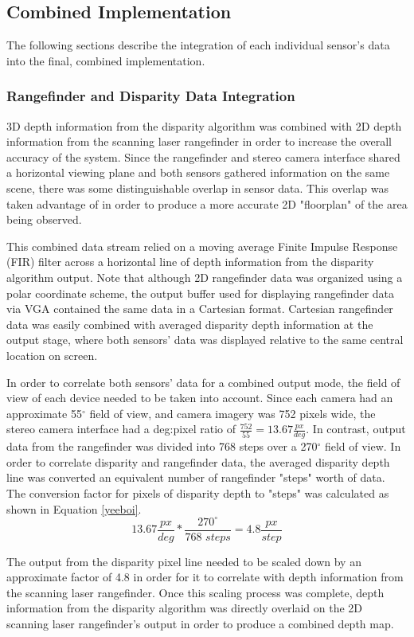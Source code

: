\subsection{Combined Implementation}
The following sections describe the integration of each individual sensor's data into the final, combined implementation. 

\subsubsection{Rangefinder and Disparity Data Integration}
3D depth information from the disparity algorithm was combined with 2D depth information from the scanning laser rangefinder in order to increase the overall accuracy of the system. Since the rangefinder and stereo camera interface shared a horizontal viewing plane and both sensors gathered information on the same scene, there was some distinguishable overlap in sensor data. This overlap was taken advantage of in order to produce a more accurate 2D "floorplan" of the area being observed.
\par
This combined data stream relied on a moving average Finite Impulse Response (FIR) filter across a horizontal line of depth information from the disparity algorithm output. Note that although 2D rangefinder data was organized using a polar coordinate scheme, the output buffer used for displaying rangefinder data via VGA contained the same data in a Cartesian format. Cartesian rangefinder data was easily combined with averaged disparity depth information at the output stage, where both sensors' data was displayed relative to the same central location on screen.
\par
In order to correlate both sensors' data for a combined output mode, the field of view of each device needed to be taken into account. Since each camera had an approximate 55$^\circ$ field of view, and camera imagery was 752 pixels wide, the stereo camera interface had a deg:pixel ratio of $\frac{752}{55}=13.67\frac{px}{deg}$. In contrast, output data from the rangefinder was divided into 768 steps over a 270$^\circ$ field of view. In order to correlate disparity and rangefinder data, the averaged disparity depth line was converted an equivalent number of rangefinder "steps" worth of data. The conversion factor for pixels of disparity depth to "steps" was calculated as shown in Equation \ref{yeeboi}.
\begin{equation} \label{yeeboi}
13.67\frac{px}{deg}*\frac{270^\circ}{768\,\,steps} = 4.8\frac{px}{step}
\end{equation}
\par
The output from the disparity pixel line needed to be scaled down by an approximate factor of 4.8 in order for it to correlate with depth information from the scanning laser rangefinder. Once this scaling process was complete, depth information from the disparity algorithm was directly overlaid on the 2D scanning laser rangefinder's output in order to produce a combined depth map. 

